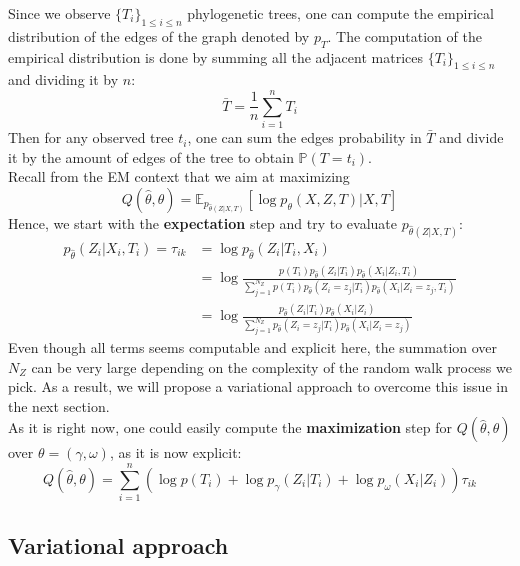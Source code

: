Since we observe $\{T_i\}_{1 \leq i \leq n}$ phylogenetic trees, one can compute the empirical distribution of the edges of the graph denoted by $p_{T}$.
The computation of the empirical distribution is done by summing all the adjacent matrices $\{T_i\}_{1 \leq i \leq n}$ and dividing it by $n$:
$$
\bar{T} = \frac{1}{n} \sum_{i=1}^n T_i
$$
Then for any observed tree $t_i$, one can sum the edges probability in $\bar{T}$ and divide it by the amount of edges of the tree to obtain $\mathbb{P}(T = t_i)$. \\

Recall from the EM context that we aim at maximizing
$$
Q(\widehat{\theta}, \theta) = \mathbb{E}_{p_{\widehat{\theta}(Z|X,T)}}[\log p_{\theta}(X, Z, T) | X,T]
$$
Hence, we start with the \textbf{expectation} step and try to evaluate $p_{\widehat{\theta}(Z|X,T)}$:
$$
\begin{align}
    p_{\widehat{\theta}}(Z_i|X_i,T_i) = \tau_{ik} &= \log p_{\widehat{\theta}}(Z_i | T_i, X_i) \\
                                &= \log \frac{p(T_i) p_{\widehat{\theta}}(Z_i | T_i) p_{\widehat{\theta}}(X_i | Z_i, T_i)}{\sum_{j=1}^{N_Z} p(T_i) p_{\widehat{\theta}}(Z_i=z_j | T_i) p_{\widehat{\theta}}(X_i | Z_i=z_j, T_i)} \\
                                &= \log \frac{p_{\widehat{\theta}}(Z_i | T_i) p_{\widehat{\theta}}(X_i | Z_i)}{\sum_{j=1}^{N_Z} p_{\widehat{\theta}}(Z_i=z_j | T_i) p_{\widehat{\theta}}(X_i | Z_i=z_j)}
\end{align}
$$
Even though all terms seems computable and explicit here, the summation over $N_Z$ can be very large depending on the complexity of the random walk process we pick.
As a result, we will propose a variational approach to overcome this issue in the next section. \\

As it is right now, one could easily compute the \textbf{maximization} step for $Q(\widehat{\theta}, \theta)$ over $\theta = (\gamma, \omega)$, as it is now explicit:
$$
Q(\widehat{\theta}, \theta) = \sum_{i=1}^n (\log p(T_i) + \log p_{\gamma}(Z_i | T_i) + \log p_{\omega}(X_i | Z_i)) \tau_{ik}
$$

\subsection{Variational approach}

